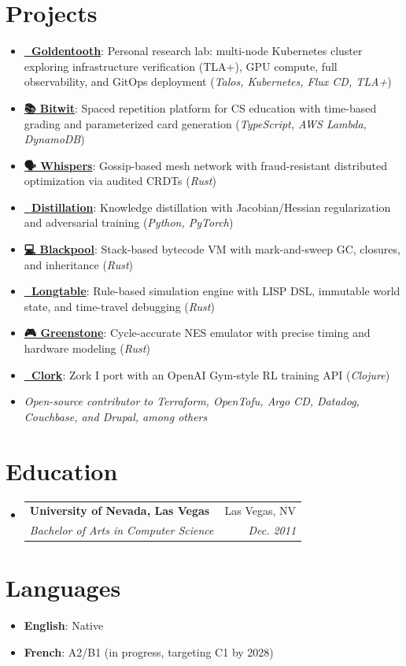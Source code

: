 \documentclass[letterpaper,11pt]{article}
\makeatletter
\newcommand{\resumeSubheading}[4]{
  \vspace{-2pt}\item
    \begin{tabular*}{0.97\textwidth}[t]{l@{\extracolsep{\fill}}r}
      \textbf{#1} & #2 \\
      \textit{\small#3} & \textit{\small #4} \\
    \end{tabular*}\vspace{-7pt}
}
\newcommand{\resumeSubheadingNote}[1]{\vspace{0pt}\item\hspace{1em}\small{\emph{#1}}\vspace{-7pt}}
\newcommand{\resumeSubHeadingListStart}{\begin{itemize}[leftmargin=0.15in, label={}]}
\newcommand{\resumeSubHeadingListEnd}{\end{itemize}}
\newenvironment{resumeListicle}{
    \small        %
    \setlength{\itemsep}{0pt}
    \setlength{\parskip}{0pt}
}{}
\newcommand{\resumeListicleStart}{\begin{resumeListicle}}
\newcommand{\resumeListicleEnd}{\end{resumeListicle}}
\newcommand{\resumeListicleItem}[2]{%
  \item \textbf{#1}: #2%
}
\newcommand{\resumeSideProjectListicleItem}[4]{%
  \item \textbf{\href{#1}{#2}}: #3 (\emph{#4})%
}
\makeatother
\begin{document}
\section{Projects}
  \resumeSubHeadingListStart
    \resumeListicleStart
      \resumeSideProjectListicleItem{https://github.com/goldentooth/}{🦷 Goldentooth}{Personal research lab: multi-node Kubernetes cluster exploring infrastructure verification (TLA+), GPU compute, full observability, and GitOps deployment}{Talos, Kubernetes, Flux CD, TLA+} \\
      \resumeSideProjectListicleItem{https://bit-wit.com/}{📚 Bitwit}{Spaced repetition platform for CS education with time-based grading and parameterized card generation}{TypeScript, AWS Lambda, DynamoDB} \\
      \resumeSideProjectListicleItem{https://github.com/ndouglas/whispers/}{🗣️ Whispers}{Gossip-based mesh network with fraud-resistant distributed optimization via audited CRDTs}{Rust} \\
      \resumeSideProjectListicleItem{https://github.com/ndouglas/distillation/}{🧪 Distillation}{Knowledge distillation with Jacobian/Hessian regularization and adversarial training}{Python, PyTorch} \\
      \resumeSideProjectListicleItem{https://github.com/ndouglas/blackpool/}{💻 Blackpool}{Stack-based bytecode VM with mark-and-sweep GC, closures, and inheritance}{Rust} \\
      \resumeSideProjectListicleItem{https://github.com/ndouglas/longtable/}{🎲 Longtable}{Rule-based simulation engine with LISP DSL, immutable world state, and time-travel debugging}{Rust} \\
      \resumeSideProjectListicleItem{https://github.com/ndouglas/greenstone/}{🎮 Greenstone}{Cycle-accurate NES emulator with precise timing and hardware modeling}{Rust} \\
      \resumeSideProjectListicleItem{https://github.com/ndouglas/clork/}{📜 Clork}{Zork I port with an OpenAI Gym-style RL training API}{Clojure} \\
    \resumeListicleEnd
    \resumeSubheadingNote{Open-source contributor to Terraform, OpenTofu, Argo CD, Datadog, Couchbase, and Drupal, among others}
  \resumeSubHeadingListEnd

\section{Education}
  \resumeSubHeadingListStart
    \resumeSubheading
      {University of Nevada, Las Vegas}{Las Vegas, NV}
      {Bachelor of Arts in Computer Science}{Dec. 2011}
  \resumeSubHeadingListEnd

\section{Languages}
  \resumeSubHeadingListStart
    \resumeListicleStart
      \resumeListicleItem{English}{Native} \\
      \resumeListicleItem{French}{A2/B1 (in progress, targeting C1 by 2028)} \\
    \resumeListicleEnd
  \resumeSubHeadingListEnd
\end{document}
